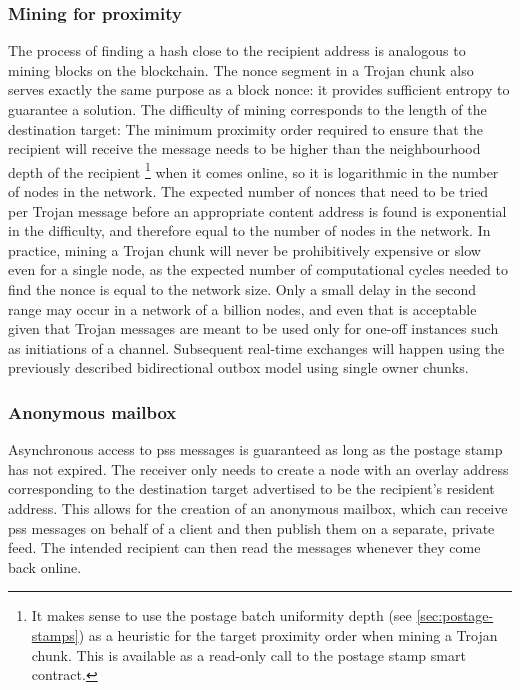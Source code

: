 \subsubsection{Mining for proximity}

The process of finding a hash close to the recipient address is analogous to mining blocks on the blockchain. The nonce segment in a Trojan chunk also serves exactly the same purpose as a block nonce: it provides sufficient entropy to guarantee a solution. The difficulty of mining corresponds to the length of the destination target: The minimum proximity order required to ensure that the recipient will receive the message needs to be higher than the neighbourhood depth of the recipient%
%
\footnote{It makes sense to use the postage batch uniformity depth (see \ref{sec:postage-stamps}) as a heuristic for the target proximity order when mining a Trojan chunk. This is available as a read-only call to the postage stamp smart contract.}
%
when it comes online, so it is logarithmic in the number of nodes in the network. The expected number of nonces that need to be tried per Trojan message before an appropriate content address is found is exponential in the difficulty, and therefore equal to the number of nodes in the network. In practice, mining a Trojan chunk will never be prohibitively expensive or slow even for a single node, as the expected number of computational cycles needed to find the nonce is equal to the network size. Only a small delay in the second range may occur in a network of a billion nodes, and even that is acceptable given that Trojan messages are meant to be used only for one-off instances such as initiations of a channel. Subsequent real-time exchanges will happen using the previously described bidirectional outbox model using single owner chunks.


\subsubsection{Anonymous mailbox}

Asynchronous access to pss messages is guaranteed as long as the postage stamp has not expired. The receiver only needs to create a node with an overlay address corresponding to the destination target advertised to be the recipient's resident address. This allows for the creation of an anonymous mailbox, which can receive pss messages on behalf of a client and then publish them on a separate, private feed. The intended recipient can then read the messages whenever they come back online.

